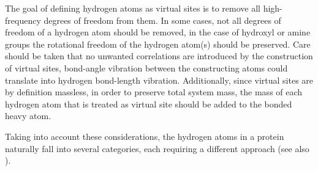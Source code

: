 The goal of defining hydrogen atoms as virtual sites is to remove all
high-frequency degrees of freedom from them. In some cases, not all
degrees of freedom of a hydrogen atom should be removed, {\eg} in the
case of hydroxyl or amine groups the rotational freedom of the
hydrogen atom(s) should be preserved. Care should be taken that no
unwanted correlations are introduced by the construction of virtual
sites, {\eg} bond-angle vibration between the constructing atoms could
translate into hydrogen bond-length vibration. Additionally, since
virtual sites are by definition massless, in order to preserve total
system mass, the mass of each hydrogen atom that is treated as virtual
site should be added to the bonded heavy atom.

Taking into account these considerations, the hydrogen atoms in a
protein naturally fall into several categories, each requiring a
different approach (see also ).


